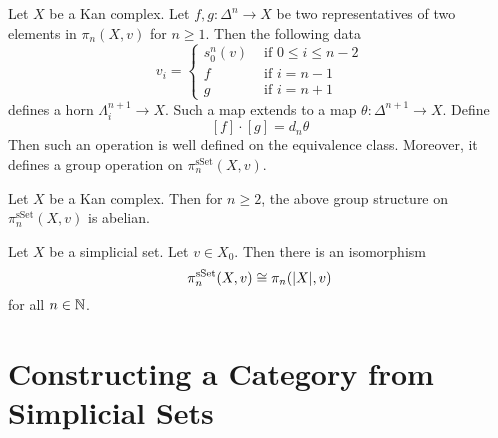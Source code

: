 \documentclass[a4paper]{article}
\begin{document}
\begin{thm}{}{} Let $X$ be a Kan complex. Let $f,g:\Delta^n\to X$ be two representatives of two elements in $\pi_n(X,v)$ for $n\geq 1$. Then the following data $$v_i=\begin{cases}
s_0^n(v) & \text{ if } 0\leq i\leq n-2\\
f & \text{ if } i=n-1\\
g & \text{ if } i=n+1
\end{cases}$$
defines a horn $\Lambda_i^{n+1}\to X$. Such a map extends to a map $\theta:\Delta^{n+1}\to X$. Define $$[f]\cdot[g]=d_n\theta$$ Then such an operation is well defined on the equivalence class. Moreover, it defines a group operation on $\pi_n^\text{sSet}(X,v)$. 
\end{thm}

\begin{thm}{}{} Let $X$ be a Kan complex. Then for $n\geq 2$, the above group structure on $\pi_n^\text{sSet}(X,v)$ is abelian. 
\end{thm}

\begin{thm}{}{} Let $X$ be a simplicial set. Let $v\in X_0$. Then there is an isomorphism $$\pi_n^\text{sSet}(X,v)\cong\pi_n(\abs{X},v)$$ for all $n\in\mathbb{N}$. 
\end{thm}

\pagebreak
\section{Constructing a Category from Simplicial Sets}
\end{document}

